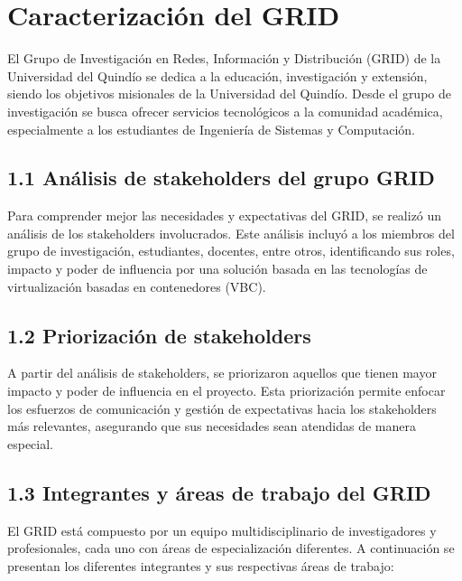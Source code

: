 \chapter*{Caracterización del GRID}
\label{cap:caracterizacionGRID}
El Grupo de Investigación en Redes, Información y Distribución (GRID) de la Universidad del Quindío se dedica a la educación, 
investigación y extensión, siendo los objetivos misionales de la Universidad del Quindío. Desde el grupo de investigación se busca ofrecer servicios tecnológicos
a la comunidad académica, especialmente a los estudiantes de Ingeniería de Sistemas y Computación.

\section*{1.1 Análisis de stakeholders del grupo GRID}
Para comprender mejor las necesidades y expectativas del GRID, se realizó un análisis de los stakeholders involucrados. Este análisis incluyó a los miembros del grupo de investigación, estudiantes, 
docentes, entre otros, identificando sus roles, impacto y poder de influencia por una solución basada en las tecnologías de virtualización basadas en contenedores (VBC).



\section*{1.2 Priorización de stakeholders}
A partir del análisis de stakeholders, se priorizaron aquellos que tienen mayor impacto y poder de influencia en el proyecto. Esta priorización permite enfocar los esfuerzos de comunicación y gestión de expectativas hacia
los stakeholders más relevantes, asegurando que sus necesidades sean atendidas de manera especial.



\section*{1.3 Integrantes y áreas de trabajo del GRID}
El GRID está compuesto por un equipo multidisciplinario de investigadores y profesionales, cada uno con áreas de especialización diferentes. A continuación se presentan los diferentes integrantes y sus respectivas áreas de trabajo:

